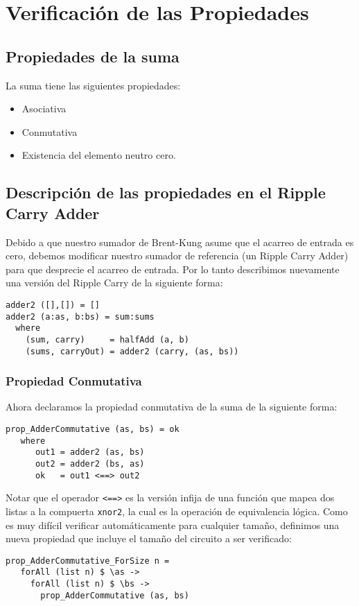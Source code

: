 \section{Verificación de las Propiedades}
\subsection{Propiedades de la suma}
La suma tiene las siguientes propiedades:
\begin{itemize}
\item Asociativa
\item Conmutativa
\item Existencia del elemento neutro cero.
\end{itemize}

\subsection{Descripción de las propiedades en el Ripple Carry Adder}
Debido a que nuestro sumador de Brent-Kung asume que el acarreo de entrada es cero, debemos modificar nuestro sumador de referencia (un Ripple Carry Adder) para que desprecie el acarreo de entrada. Por lo tanto describimos nuevamente una versión del Ripple Carry de la siguiente forma:


\begin{lstlisting}
adder2 ([],[]) = []
adder2 (a:as, b:bs) = sum:sums
  where
    (sum, carry)     = halfAdd (a, b)
    (sums, carryOut) = adder2 (carry, (as, bs))
\end{lstlisting}

\subsubsection{Propiedad Conmutativa}
Ahora declaramos la propiedad conmutativa de la suma de la siguiente forma:
\begin{verbatim}
prop_AdderCommutative (as, bs) = ok
   where
      out1 = adder2 (as, bs)
      out2 = adder2 (bs, as)
      ok   = out1 <==> out2
\end{verbatim}
\noindent Notar que el operador {\footnotesize\verb|<==>|} es la versión infija de una función que mapea dos listas a la compuerta {\footnotesize\verb|xnor2|}, la cual es la operación de equivalencia lógica. Como es muy difícil verificar automáticamente para cualquier tamaño, definimos una nueva propiedad que incluye el tamaño del circuito a ser verificado:
\begin{verbatim}
prop_AdderCommutative_ForSize n =
   forAll (list n) $ \as ->
     forAll (list n) $ \bs ->
       prop_AdderCommutative (as, bs)
\end{verbatim}

